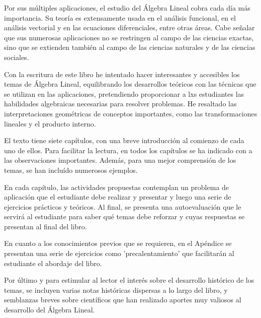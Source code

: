 \documentclass[a4paper,12pt,twopage]{book}
\begin{document}
Por sus múltiples aplicaciones, el estudio del Álgebra Lineal cobra cada día más importancia.  Su teoría es extensamente usada en el análisis funcional, en el análisis vectorial y en las ecuaciones diferenciales, entre otras áreas. Cabe señalar que sus numerosas aplicaciones no se restringen al campo de las ciencias exactas, sino que se extienden también al campo de las ciencias naturales y de las ciencias sociales.




Con la escritura de este libro he intentado  hacer interesantes y accesibles los temas de Álgebra Lineal, equilibrando los desarrollos teóricos con las técnicas que se utilizan en las aplicaciones, pretendiendo proporcionar a lxs estudiantes las habilidades algebraicas necesarias para resolver problemas. He resaltado las interpretaciones geométricas de conceptos importantes, como las transformaciones lineales y el producto interno. 

El texto tiene siete capítulos, con una breve introducción al comienzo de cada uno de ellos.  Para facilitar la lectura, en todos los capítulos se ha  indicado con  a las  observaciones importantes. Además, para una mejor comprensión de los temas, se han incluído numerosos ejemplos. 


En cada capítulo, las actividades propuestas contemplan  un problema de aplicación que el estudiante debe realizar y presentar y luego una serie de ejercicios  prácticos y teóricos. Al final, se presenta una autoevaluación  que le servirá al estudiante  para saber qué temas debe reforzar y cuyas respuestas se presentan al final del libro.


En cuanto a los conocimientos previos que se requieren, en el Apéndice se presentan  una serie de ejercicios  como 'precalentamiento' que facilitarán al estudiante el abordaje del libro. 

Por último y para estimular al lector el interés sobre el desarrollo histórico de los temas, se incluyen varias notas históricas dispersas  a lo largo del libro, y   semblanzas breves sobre científicos  que han realizado aportes muy valiosos al desarrollo del Álgebra Lineal. 
\end{document}

